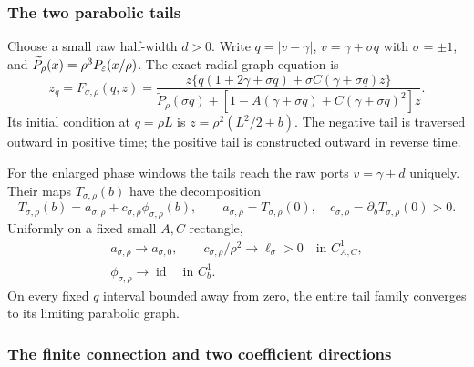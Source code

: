 

\subsubsection{The two parabolic tails}

Choose a small raw half-width $d>0$. Write $q=|v-\gamma|$,
$v=\gamma+\sigma q$ with $\sigma=\pm1$, and
$\widetilde P_\rho(x)=\rho^3P_\varepsilon(x/\rho)$.
The exact radial graph equation is
\begin{equation}\label{p4:tail}
 z_q=F_{\sigma,\rho}(q,z)=
 \frac{z\{q(1+2\gamma+\sigma q)
                  +\sigma C(\gamma+\sigma q)z\}}
 {\widetilde P_\rho(\sigma q)+
       [1-A(\gamma+\sigma q)+C(\gamma+\sigma q)^2]z}.
\end{equation}
Its initial condition at $q=\rho L$ is
$z=\rho^2(L^2/2+b)$.
The negative tail is traversed outward in positive time; the positive
tail is constructed outward in reverse time.

\begin{lemma}\label{p4:tails}
For the enlarged phase windows the tails reach the raw ports
$v=\gamma\pm d$ uniquely. Their maps $T_{\sigma,\rho}(b)$ have the
decomposition
\begin{equation}\label{p4:tail-decomposition}
 T_{\sigma,\rho}(b)=a_{\sigma,\rho}
             +c_{\sigma,\rho}\phi_{\sigma,\rho}(b),\qquad
 a_{\sigma,\rho}=T_{\sigma,\rho}(0),\quad
 c_{\sigma,\rho}=\partial_bT_{\sigma,\rho}(0)>0.
\end{equation}
Uniformly on a fixed small $A,C$ rectangle,
\begin{equation}\label{p4:tail-limits}
\begin{gathered}
 a_{\sigma,\rho}\to a_{\sigma,0},\qquad
 c_{\sigma,\rho}/\rho^2\to\ell_\sigma>0
                  \quad\text{in }C^1_{A,C},\\
 \phi_{\sigma,\rho}\to\operatorname{id}
                  \quad\text{in }C^1_b.
\end{gathered}
\end{equation}
On every fixed $q$ interval bounded away from zero, the entire
tail family converges to its limiting parabolic graph.
\end{lemma}



\subsubsection{The finite connection and two coefficient directions}

